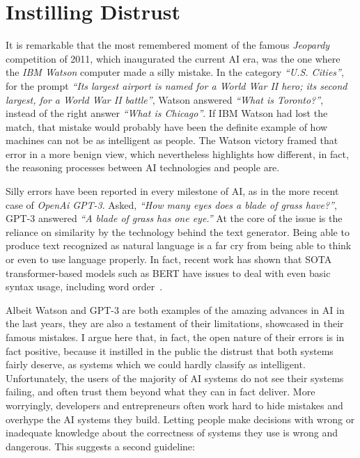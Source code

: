 \documentclass{article}
\begin{document}
\section{Instilling Distrust}

It is remarkable that the most remembered moment of the famous \emph{Jeopardy} competition of 2011, which inaugurated the current AI era, was the one where the \emph{IBM Watson} computer made a silly mistake. In the category \emph{``U.S. Cities''}, for the prompt \emph{``Its largest airport is named for a World War II hero; its second largest, for a World War II battle''}, Watson answered \emph{``What is Toronto?''}, instead of the right answer \emph{``What is Chicago''}.  %
If IBM Watson had lost the match, that mistake would probably have been the definite example of how machines can not be as intelligent as people. The Watson victory framed that error in a more benign view, which nevertheless highlights how different, in fact, the reasoning processes between  AI technologies and people are.

Silly errors have been reported in every milestone of AI, as in the more recent case of \emph{OpenAi GPT-3}. Asked, \emph{``How many eyes does a blade of grass have?''}, GPT-3 answered \emph{``A blade of grass has one eye.''} At the core of the issue is the reliance on similarity by the technology behind the text generator. Being able to produce text recognized as natural language is a far cry from being able to think or even to use language properly. In fact, recent work has shown that SOTA transformer-based models such as BERT have issues to deal with even basic syntax usage, including word order~\cite{sinha2020unnatural}.

Albeit Watson and GPT-3 are both examples of the amazing advances in AI in the last years, they are also a testament of their limitations, showcased in their famous mistakes. I argue here that, in fact, the open nature of their errors is in fact positive, because it instilled in the public the distrust that both systems fairly deserve, as systems which we could hardly classify as intelligent. Unfortunately, the users of the majority of AI systems do not see their systems failing, and often trust them beyond what they can in fact deliver. More worryingly, developers and entrepreneurs often work hard to hide mistakes and overhype the AI systems they build. Letting people make decisions with wrong or inadequate knowledge about the correctness of systems they use is wrong and dangerous. This suggests a second guideline:
\end{document}
